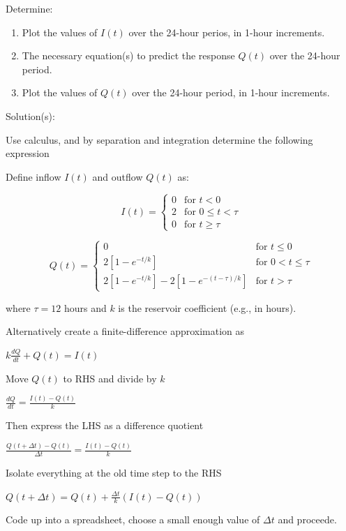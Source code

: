 \documentclass[12pt]{article}
\begin{document}
\begin{enumerate}
Determine:
\begin{enumerate}
\item Plot the values of $I(t)$ over the 24-hour perios, in 1-hour increments.
\item The necessary equation(s) to predict the response $Q(t)$ over the 24-hour period.
\item Plot the values of $Q(t)$ over the 24-hour period, in 1-hour increments.
\end{enumerate}

Solution(s):

Use calculus, and by separation and integration determine the following expression

Define inflow \( I(t) \) and outflow \( Q(t) \) as:

\[
I(t) =
\begin{cases}
0 & \text{for } t < 0 \\
2 & \text{for } 0 \leq t < \tau \\
0 & \text{for } t \geq \tau
\end{cases}
\]

\[
Q(t) =
\begin{cases}
0 & \text{for } t \leq 0 \\
2\left[1 - e^{-t/k}\right] & \text{for } 0 < t \leq \tau \\
2\left[1 - e^{-t/k}\right] - 2\left[1 - e^{-(t - \tau)/k}\right] & \text{for } t > \tau
\end{cases}
\]

where \( \tau = 12 \) hours and \( k \) is the reservoir coefficient (e.g., in hours).

Alternatively create a finite-difference approximation as

$k\frac{dQ}{dt} + Q(t) = I(t)$

Move $Q(t)$ to RHS and divide by $k$

$\frac{dQ}{dt}  = \frac{I(t)-Q(t)}{k}$

Then express the LHS as a difference quotient

$\frac{Q(t+\Delta t) - Q(t)}{\Delta t}  = \frac{I(t)-Q(t)}{k}$

Isolate everything at the old time step to the RHS

$Q(t+\Delta t)  = Q(t)  + \frac{\Delta t}{k} (I(t)-Q(t))$

Code up into a spreadsheet, choose a small enough value of $\Delta t$ and proceede.


\end{enumerate}
\end{document}
